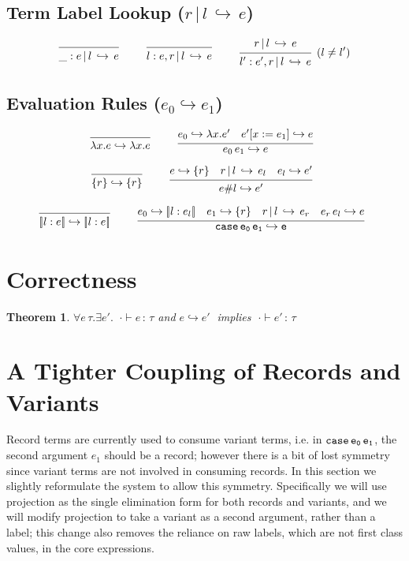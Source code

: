 \documentclass{article}
\newtheorem{theorem}{Theorem}
\newcommand{\variant}[1]{[\!|#1|\!]}
\newcommand{\case}[2]{\tt{case}\,#1\,#2}
\newcommand{\app}[2]{#1\,#2}
\newcommand{\lam}[2]{\lambda #1 . #2}
\newcommand{\hastp}[3]{#1 \vdash #2 \,:\, #3}
\newcommand{\haslbltm}[3]{#1\,|\,#2\,\hookrightarrow\, #3}
\newcommand{\eval}[2]{#1 \hookrightarrow #2}
\newcommand{\deduct}[3][]
{
  \begin{prooftree}
    \hypo{#2}
    \infer1[\text{#1}]{#3}
  \end{prooftree}
}
\begin{document}
\subsection{Term Label Lookup \;($\haslbltm{r}{l}{e}$)}
\[
\deduct
    {}
    {\haslbltm{\_ : e}{l}{e}}
    {}
\qquad
\deduct
    {}
    {\haslbltm{l:e,r}{l}{e}}
    {}
\qquad
\deduct
    {\haslbltm{r}{l}{e}}
    {\haslbltm{l':e',r}{l}{e}}
    {(l \neq l')}
\]

\subsection{Evaluation Rules  \;($\eval{e_0}{e_1}$)}
\[
\deduct
    {}
    {\eval{\lam{x}{e}}{\lam{x}{e}}}
    {}
\qquad
\deduct
    {\eval{e_0}{\lam{x}{e'}}
     \quad
     \eval{e'[x:=e_1]}{e}
    }
    {\eval{\app{e_0}{e_1}}{e}}
    {}
\]

\[
\deduct
    {}
    {\eval{\{r\}}{\{r\}}}
    {}
\qquad
\deduct
    {\eval{e}{\{r\}}
     \quad
     \haslbltm{r}{l}{e_l}
     \quad
     \eval{e_l}{e'}
    }
    {\eval{e\#l}{e'}}
    {}
\]

\[
\deduct
    {}
    {\eval{\variant{l:e}}{\variant{l:e}}}
    {}
\qquad
\deduct
    {\eval{e_0}{\variant{l:e_l}}
     \quad
     \eval{e_1}{\{r\}}
     \quad
     \haslbltm{r}{l}{e_r}
     \quad
     \eval{\app{e_r}{e_l}}{e}
    }
    {\eval{\case{e_0}{e_1}}{e}}
    {}
\]

\section{Correctness}

\begin{theorem}
$\forall e \,\tau . \exists e' . \;\;\hastp{\cdot}{e}{\tau}$ and $\eval{e}{e'}\;$ implies $\;\hastp{\cdot}{e'}{\tau}$
\end{theorem}

\section{A Tighter Coupling of Records and Variants}
Record terms are currently used to consume variant terms, i.e. in
$\case{e_0}{e_1}$, the second argument $e_1$ should be a record;
however there is a bit of lost symmetry since variant terms are not
involved in consuming records. In this section we slightly reformulate
the system to allow this symmetry. Specifically we will use projection
as the single elimination form for both records and variants, and we
will modify projection to take a variant as a second argument, rather
than a label; this change also removes the reliance on raw labels,
which are not first class values, in the core expressions.
\\
\end{document}
